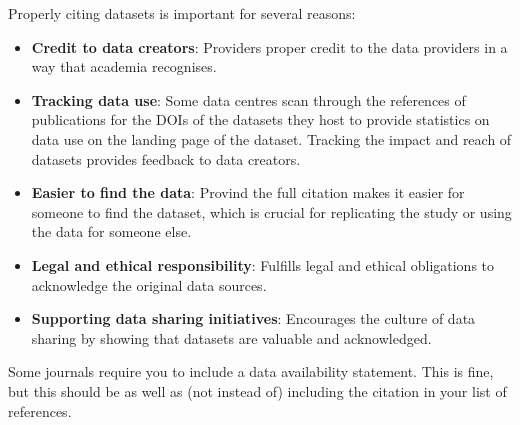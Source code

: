 \documentclass[a4paper,12pt]{article}
\begin{document}
Properly citing datasets is important for several reasons:
\begin{itemize}
    \item \textbf{Credit to data creators}: Providers proper credit to the data providers in a way that academia recognises. 
    \item \textbf{Tracking data use}: Some data centres scan through the references of publications for the DOIs of the datasets they host to provide statistics on data use on the landing page of the dataset. Tracking the impact and reach of datasets provides feedback to data creators.  
    \item \textbf{Easier to find the data}: Provind the full citation makes it easier for someone to find the dataset, which is crucial for replicating the study or using the data for someone else.
    \item \textbf{Legal and ethical responsibility}: Fulfills legal and ethical obligations to acknowledge the original data sources.
    \item \textbf{Supporting data sharing initiatives}: Encourages the culture of data sharing by showing that datasets are valuable and acknowledged.
\end{itemize}

Some journals require you to include a data availability statement. This is fine, but this should be as well as (not instead of) including the citation in your list of references.



\end{document}
